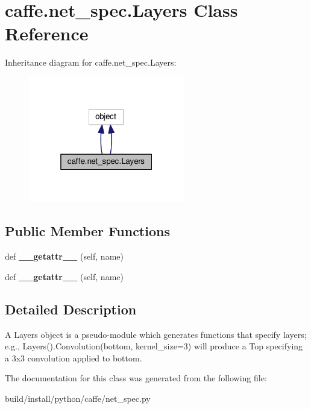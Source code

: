 \hypertarget{classcaffe_1_1net__spec_1_1_layers}{}\section{caffe.\+net\+\_\+spec.\+Layers Class Reference}
\label{classcaffe_1_1net__spec_1_1_layers}


Inheritance diagram for caffe.\+net\+\_\+spec.\+Layers\+:
\nopagebreak
\begin{figure}[H]
\begin{center}
\leavevmode
\includegraphics[width=193pt]{classcaffe_1_1net__spec_1_1_layers__inherit__graph}
\end{center}
\end{figure}
\subsection*{Public Member Functions}
\begin{DoxyCompactItemize}
\item 
\mbox{\label{classcaffe_1_1net__spec_1_1_layers_ab69afc2690f9b12582dbfd93bdc4faa5}} 
def {\bfseries \+\_\+\+\_\+getattr\+\_\+\+\_\+} (self, name)
\item 
\mbox{\label{classcaffe_1_1net__spec_1_1_layers_ab69afc2690f9b12582dbfd93bdc4faa5}} 
def {\bfseries \+\_\+\+\_\+getattr\+\_\+\+\_\+} (self, name)
\end{DoxyCompactItemize}


\subsection{Detailed Description}
\begin{DoxyVerb}A Layers object is a pseudo-module which generates functions that specify
layers; e.g., Layers().Convolution(bottom, kernel_size=3) will produce a Top
specifying a 3x3 convolution applied to bottom.\end{DoxyVerb}
 

The documentation for this class was generated from the following file\+:\begin{DoxyCompactItemize}
\item 
build/install/python/caffe/net\+\_\+spec.\+py\end{DoxyCompactItemize}
